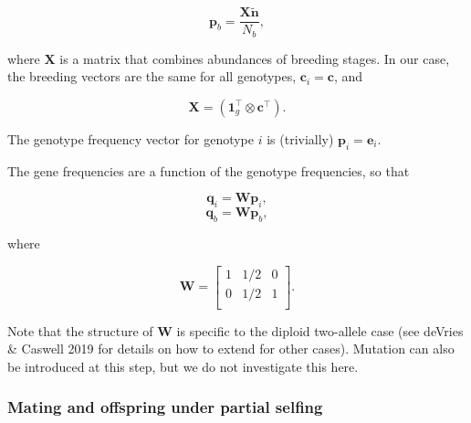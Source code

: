 \documentclass[11pt]{article}
\def\mbf#1{\mathbf{#1}}
\begin{document}
\begin{equation}
	\mbf{p}_b = \frac{\mbf{X} \tilde{\mbf{n}}}{N_b},
\end{equation}

\noindent where $\mbf{X}$ is a matrix that combines abundances of breeding stages. In our case, the breeding vectors are the same for all genotypes, $\mbf{c}_i = \mbf{c}$, and 

\begin{equation}
	\mbf{X} = (\mbf{1}_g^\intercal \otimes \mbf{c}^\intercal).
\end{equation}

\noindent The genotype frequency vector for genotype $i$ is (trivially) $\mbf{p}_i = \mbf{e}_i$.

The gene frequencies are a function of the genotype frequencies, so that

\begin{equation}
		\mbf{q}_i = \mbf{W} \mbf{p}_i,
\end{equation}
\begin{equation}
		\mbf{q}_b = \mbf{W} \mbf{p}_b,
\end{equation}

\noindent where

\begin{equation}
		\mbf{W} = \left[
						\begin{array}{ccc}
							1 & 1/2 & 0 \\
							0 & 1/2 & 1 \\
						\end{array} \right].
\end{equation}

\noindent Note that the structure of $\mbf{W}$ is specific to the diploid two-allele case (see deVries \& Caswell 2019 for details on how to extend for other cases). Mutation can also be introduced at this step, but we do not investigate this here.

\subsubsection*{Mating and offspring under partial selfing}
\end{document}
